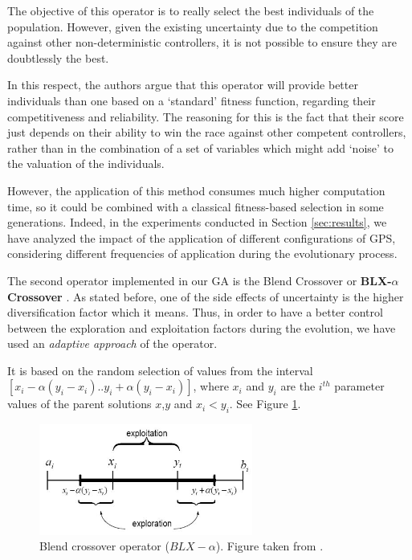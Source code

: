 \documentclass[10pt,journal,compsoc]{IEEEtran}
\begin{document}
The objective of this operator is to really select the best individuals of the population. However, given the existing uncertainty \cite{merelo2016statistical} due to the competition against other non-deterministic controllers, it is not possible to ensure they are doubtlessly the best.

In this respect, the authors argue that this operator will provide better individuals than one based on a `standard' fitness function, regarding their competitiveness and reliability. The reasoning for this is the fact that their score just depends on their ability to win the race against other competent controllers, rather than in the combination of a set of variables which might add `noise' to the valuation of the individuals.

However, the application of this method consumes much higher computation time, so it could be combined with a classical fitness-based selection in some generations. Indeed, in the experiments conducted in Section \ref{sec:results}, we have analyzed the impact of the application of different configurations of GPS, considering different frequencies of application during the evolutionary process.



The second operator implemented in our GA is the Blend Crossover or  \textbf{BLX-$\alpha$ Crossover} \cite{blx2008}. As stated before, one of the side effects of uncertainty is the higher diversification factor which it means. Thus, in order to have a better control between the exploration and exploitation factors during the evolution, we have used an \textit{adaptive approach} of the operator.

It is based on the random selection of values from the interval $[x_i-\alpha(y_i-x_i).. y_i+\alpha(y_i-x_i)]$, where $x_i$ and $y_i$ are the $i^{th}$ parameter values of the parent solutions $x$,$y$ and $x_i < y_i$. See Figure \ref{fig:blxalpha}.

 \begin{figure}[!ht]	
 	\begin{center}
 		\includegraphics[width=7cm]{fig/blxalpha.jpg}
 		\caption{Blend crossover operator ($BLX-\alpha$). Figure taken from \cite{Adibo_BLXFig_03}.}
 		\label{fig:blxalpha}	
 	\end{center}	
 \end{figure}
\end{document}
